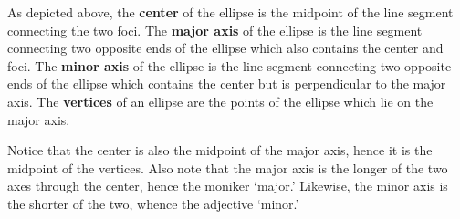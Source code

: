 \documentclass{ximera}
\begin{document}
\begin{image}
\end{image}

\begin{center}
\end{center} 

As depicted above,  the \textbf{center} of the ellipse is the midpoint of the line segment connecting the two foci.  The \textbf{major axis} of the ellipse is the line segment connecting two opposite ends of the ellipse which also contains the center and foci.  The \textbf{minor axis} of the ellipse is the line segment connecting two opposite ends of the ellipse which contains the center but is perpendicular to the major axis.  The \textbf{vertices} of an ellipse are the points of the ellipse which lie on the major axis. 

 

 Notice that the center is also the midpoint of the major axis, hence it is the midpoint of the vertices. Also note that the major axis is the longer of the two axes through the center, hence the moniker `major.'  Likewise, the minor axis is the shorter of the two, whence the adjective `minor.' 
\end{document}
